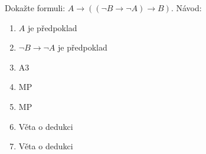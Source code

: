 Dokažte formuli: $A \rightarrow ( (\neg B \rightarrow \neg A) \rightarrow B)$.
Návod:
\begin{enumerate}[1)]
  \item $A$ je předpoklad
  \item $\neg B \rightarrow \neg A$ je předpoklad
  \item A3
  \item MP
  \item MP
  \item Věta o dedukci
  \item Věta o dedukci
\end{enumerate}

